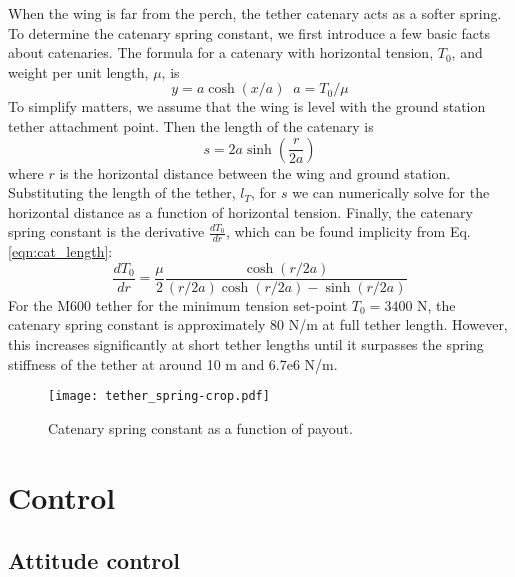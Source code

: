 \documentclass[11pt]{amsart}
\begin{document}
When the wing is far from the perch, the tether catenary acts as a
softer spring.  To determine the catenary spring constant, we first
introduce a few basic facts about catenaries.  The formula for a
catenary with horizontal tension, $T_0$, and weight per unit length,
$\mu$, is
\begin{equation}
y = a \cosh (x / a)\;\; a = T_0 / \mu
\end{equation}
To simplify matters, we assume that the wing is level with the ground
station tether attachment point.  Then the length of the catenary is
\begin{equation}
s = 2 a \sinh \left(\frac{r}{2a}\right)
\label{eqn:cat_length}
\end{equation}
where $r$ is the horizontal distance between the wing and ground
station.  Substituting the length of the tether, $l_T$, for $s$ we can
numerically solve for the horizontal distance as a function of
horizontal tension.  Finally, the catenary spring constant is the
derivative $\frac{dT_0}{dr}$, which can be found implicity from
Eq. \ref{eqn:cat_length}:
\begin{equation}
\frac{dT_0}{dr} = \frac{\mu}{2}
\frac{\cosh(r / 2a)}{(r/2a)\cosh(r/2a) - \sinh(r/2a)}
\end{equation}
For the M600 tether for the minimum tension set-point $T_0 = 3400$ N,
the catenary spring constant is approximately 80 N/m at full tether
length.  However, this increases significantly at short tether lengths
until it surpasses the spring stiffness of the tether at around 10 m
and 6.7e6 N/m.

\begin{figure}[h]
\texttt{[image: tether\_spring-crop.pdf]}
\caption{Catenary spring constant as a function of payout.}
\end{figure}

\section{Control}

\subsection{Attitude control}
\end{document}
